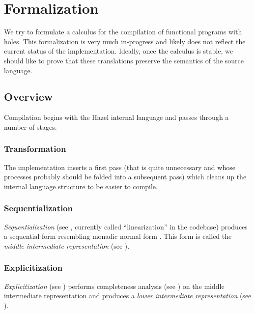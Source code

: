 \documentclass[index.tex]{subfiles}
\begin{document}
\section{Formalization}
\label{formalization}
We try to formulate a calculus for the compilation of functional programs with holes. This
formalization is very much in-progress and likely does not reflect the current status of the
implementation. Ideally, once the calculus is stable, we should like to prove that these
translations preserve the semantics of the source language.

\subsection{Overview}
Compilation begins with the Hazel internal language and passes through a number of stages.

\subsubsection{Transformation}
The implementation inserts a first pass (that is quite unnecessary and whose processes probably
should be folded into a subsequent pass) which cleans up the internal language structure to be
easier to compile.

\subsubsection{Sequentialization}
\emph{Sequentialization} (see , currently called ``linearization'' in
the codebase) produces a sequential form resembling monadic normal form \cite{danvy2003}. This form
is called the \emph{middle intermediate representation} (see ).

\subsubsection{Explicitization}
\emph{Explicitization} (see ) performs completeness analysis (see
) on the middle intermediate representation and produces a
\emph{lower intermediate representation} (see ).



\end{document}
